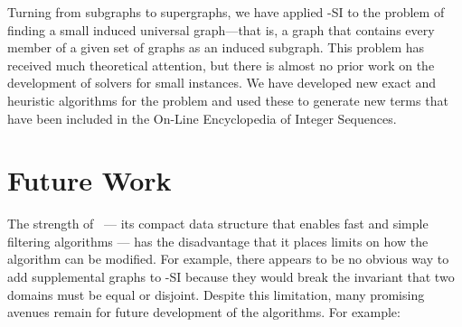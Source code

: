 Turning from subgraphs to supergraphs,
we have applied \McSplit-SI to the problem of finding a small induced universal
graph---that is, a graph that contains every member of a given set of graphs as
an induced subgraph. This problem has received much theoretical attention,
but there is almost no prior work on the development of solvers for
small instances.  We have developed new exact and heuristic algorithms for the
problem and used these to generate new terms that have been included in the
On-Line Encyclopedia of Integer Sequences.

\section{Future Work}

The strength of \McSplit\ --- its compact data structure that
enables fast and simple filtering algorithms --- has the
disadvantage that it places limits on how the algorithm can be modified.  For example, there
appears to be no obvious way to add supplemental graphs to \McSplit-SI because
they would break the invariant that two domains must be equal or disjoint.  Despite
this limitation,
many promising avenues remain for future development of the
algorithms. For example:

